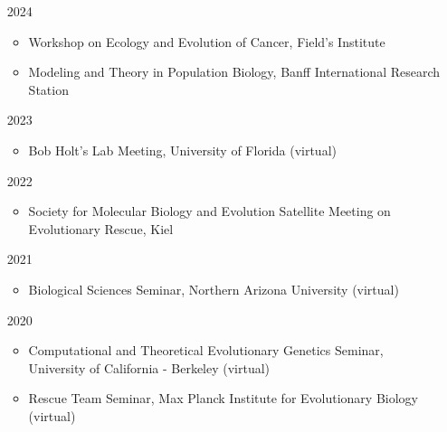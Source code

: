 \documentclass[12pt]{article}
\begin{document}
    \begin{itemize}
    \item [2024]
      \begin{itemize}
      \item Workshop on Ecology and Evolution of Cancer, Field's Institute
      \item Modeling and Theory in Population Biology, Banff International Research Station
      \end{itemize}

    \item [2023]
      \begin{itemize}
      \item Bob Holt's Lab Meeting, University of Florida (virtual)
      \end{itemize}

    \item [2022]
      \begin{itemize}
      \item Society for Molecular Biology and Evolution Satellite Meeting on Evolutionary Rescue, Kiel
      \end{itemize}

    \item [2021]
      \begin{itemize}
      \item Biological Sciences Seminar, Northern Arizona University (virtual)
      \end{itemize}

    \item [2020]
      \begin{itemize}
      \item Computational and Theoretical Evolutionary Genetics Seminar, University of California - Berkeley (virtual)
      \item Rescue Team Seminar, Max Planck Institute for Evolutionary Biology (virtual)
      \end{itemize}


\end{itemize}
\end{document}
